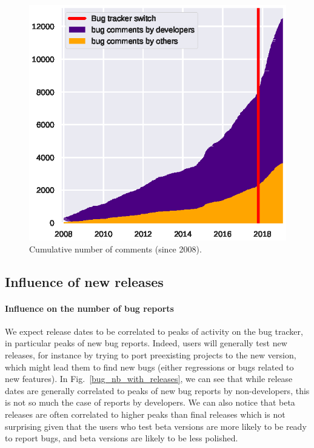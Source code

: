 \documentclass[conference]{IEEEtran}
\begin{document}
\begin{figure}
\includegraphics{cumulative_comments.eps}
\caption{Cumulative number of comments (since 2008).} \label{cumulative_comments}
\end{figure}

\subsection{Influence of new releases}
\label{influence_release}

\paragraph{Influence on the number of bug reports}
We expect release dates to be correlated to peaks of activity on the bug tracker, in particular peaks of new bug reports. Indeed, users will generally test new releases, for instance by trying to port preexisting projects to the new version, which might lead them to find new bugs (either regressions or bugs related to new features). In Fig.~\ref{bug_nb_with_releases}, we can see that while release dates are generally correlated to peaks of new bug reports by non-developers, this is not so much the case of reports by developers. We can also notice that beta releases are often correlated to higher peaks than final releases which is not surprising given that the users who test beta versions are more likely to be ready to report bugs, and beta versions are likely to be less polished.
\end{document}

